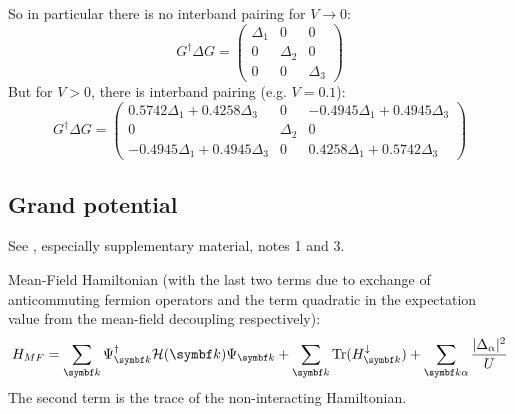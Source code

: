 \documentclass[../notes.tex]{subfiles}
\begin{document}
So in particular there is no interband pairing for \(V \to 0\):
\begin{equation}
	G^{\dagger} \Delta G =
	\begin{pmatrix}
		\Delta_1 & 0 & 0 \\
		0 & \Delta_{2} & 0 \\
		0 & 0 & \Delta_3
	\end{pmatrix}
\end{equation}
But for \(V > 0\), there is interband pairing (e.g. \(V = 0.1\)):
\begin{equation}
	G^{\dagger} \Delta G =
	\begin{pmatrix}
		0.5742 \Delta_{1} + 0.4258 \Delta_{3} & 0 & - 0.4945 \Delta_{1} + 0.4945 \Delta_{3} \\
		0 & \Delta_{2} & 0 \\
		- 0.4945 \Delta_{1} + 0.4945 \Delta_{3} & 0 & 0.4258 \Delta_{1} + 0.5742 \Delta_{3}
	\end{pmatrix}
\end{equation}

\subsection{Grand potential}

See \cite{peottaSuperfluidityTopologicallyNontrivial2015}, especially supplementary material, notes 1 and 3.

Mean-Field Hamiltonian (with the last two terms due to exchange of anticommuting fermion operators and the term quadratic in the expectation value from the mean-field decoupling respectively):
\begin{equation}
	H_{MF} = \sum_{\vb{k}} \Psi_{\vb{k}}^{\dagger} \mathcal{H} (\vb{k}) \Psi_{\vb{k}} + \sum_{\vb{k}} \Tr(H^{\downarrow}_{\vb{k}}) + \sum_{\vb{k} \alpha} \frac{\vert \Delta_{\alpha} \vert^2}{U}
\end{equation}
The second term is the trace of the non-interacting Hamiltonian.
\end{document}
